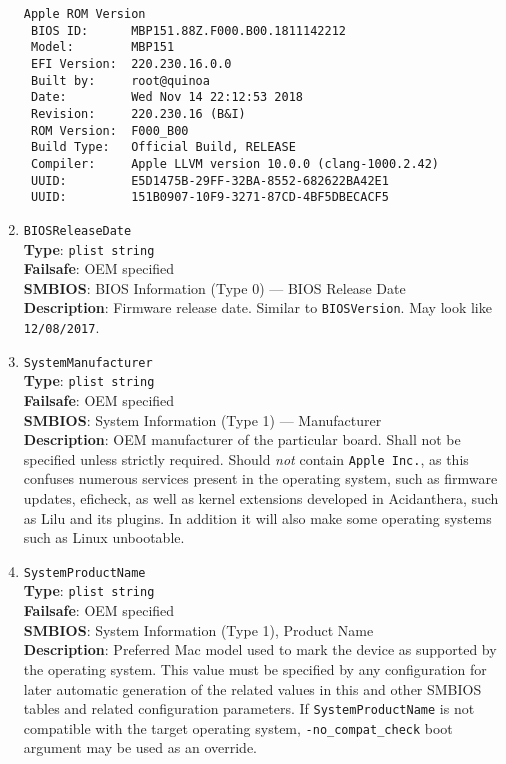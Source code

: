 \documentclass[]{article}
\begin{document}
\begin{enumerate}
\begin{verbatim}
Apple ROM Version
 BIOS ID:      MBP151.88Z.F000.B00.1811142212
 Model:        MBP151
 EFI Version:  220.230.16.0.0
 Built by:     root@quinoa
 Date:         Wed Nov 14 22:12:53 2018
 Revision:     220.230.16 (B&I)
 ROM Version:  F000_B00
 Build Type:   Official Build, RELEASE
 Compiler:     Apple LLVM version 10.0.0 (clang-1000.2.42)
 UUID:         E5D1475B-29FF-32BA-8552-682622BA42E1
 UUID:         151B0907-10F9-3271-87CD-4BF5DBECACF5
\end{verbatim}
\item
  \texttt{BIOSReleaseDate}\\
  \textbf{Type}: \texttt{plist\ string}\\
  \textbf{Failsafe}: OEM specified\\
  \textbf{SMBIOS}: BIOS Information (Type 0) --- BIOS Release Date\\
  \textbf{Description}: Firmware release date. Similar to
  \texttt{BIOSVersion}. May look like \texttt{12/08/2017}.
\item
  \texttt{SystemManufacturer}\\
  \textbf{Type}: \texttt{plist\ string}\\
  \textbf{Failsafe}: OEM specified\\
  \textbf{SMBIOS}: System Information (Type 1) --- Manufacturer\\
  \textbf{Description}: OEM manufacturer of the particular board. Shall
  not be specified unless strictly required. Should \emph{not} contain
  \texttt{Apple\ Inc.}, as this confuses numerous services present in
  the operating system, such as firmware updates, eficheck, as well as
  kernel extensions developed in Acidanthera, such as Lilu and its
  plugins. In addition it will also make some operating systems
  such as Linux unbootable.
\item
  \texttt{SystemProductName}\\
  \textbf{Type}: \texttt{plist\ string}\\
  \textbf{Failsafe}: OEM specified\\
  \textbf{SMBIOS}: System Information (Type 1), Product Name\\
  \textbf{Description}: Preferred Mac model used to mark the device as
  supported by the operating system. This value must be specified by any
  configuration for later automatic generation of the related values in
  this and other SMBIOS tables and related configuration parameters. If
  \texttt{SystemProductName} is not compatible with the target operating
  system, \texttt{-no\_compat\_check} boot argument may be used as an
  override.


\end{enumerate}
\end{document}
